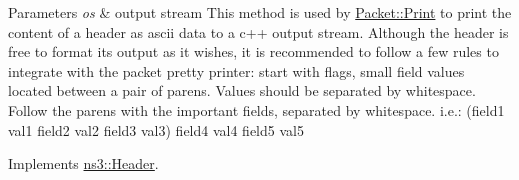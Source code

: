 \begin{DoxyParams}{Parameters}
{\em os} & output stream This method is used by \hyperlink{classns3_1_1Packet_aa34058a5cdbf94673531f8c4001ab227}{Packet\+::\+Print} to print the content of a header as ascii data to a c++ output stream. Although the header is free to format its output as it wishes, it is recommended to follow a few rules to integrate with the packet pretty printer\+: start with flags, small field values located between a pair of parens. Values should be separated by whitespace. Follow the parens with the important fields, separated by whitespace. i.\+e.\+: (field1 val1 field2 val2 field3 val3) field4 val4 field5 val5 \\
\hline
\end{DoxyParams}


Implements \hyperlink{classns3_1_1Header_a2ce1df7579b2ade7bc7302357feac77a}{ns3\+::\+Header}.


